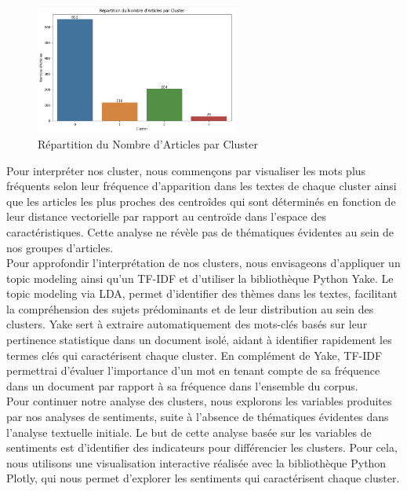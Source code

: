 \documentclass{article}
\begin{document}
\begin{figure}[!htbp]
    \centering
    \includegraphics[width=0.6\textwidth]{repartition_cluster_bert.png}
    \caption{Répartition du Nombre d'Articles par Cluster}
    \label{fig:plots}
\end{figure}

Pour interpréter nos cluster, nous commençons par visualiser les mots plus fréquents selon leur fréquence d'apparition dans les textes de chaque cluster ainsi que les articles les plus proches des centroîdes qui sont déterminés en fonction de leur distance vectorielle par rapport au centroïde dans l'espace des caractéristiques. Cette analyse ne révèle pas de thématiques évidentes au sein de nos groupes d'articles. \\

Pour approfondir l'interprétation de nos clusters, nous envisageons d'appliquer un topic modeling ainsi qu'un TF-IDF et d'utiliser la bibliothèque Python Yake. Le topic modeling via LDA, permet d'identifier des thèmes dans les textes, facilitant la compréhension des sujets prédominants et de leur distribution au sein des clusters. Yake sert à extraire automatiquement des mots-clés basés sur leur pertinence statistique dans un document isolé, aidant à identifier rapidement les termes clés qui caractérisent chaque cluster. En complément de Yake, TF-IDF permettrai d'évaluer l'importance d'un mot en tenant compte de sa fréquence dans un document par rapport à sa fréquence dans l'ensemble du corpus. \\

Pour continuer notre analyse des clusters, nous explorons les variables produites par nos analyses de sentiments, suite à l'absence de thématiques évidentes dans l'analyse textuelle initiale. Le but de cette analyse basée sur les variables de sentiments est d'identifier des indicateurs pour différencier les clusters. Pour cela, nous utilisons une visualisation interactive réalisée avec la bibliothèque Python Plotly, qui nous permet d'explorer les sentiments qui caractérisent chaque cluster. \\
\end{document}

